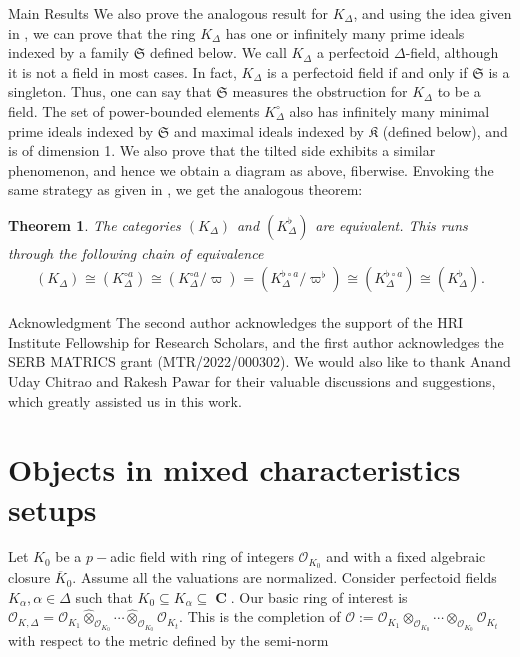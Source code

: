 \documentclass[12pts,a4paper]{amsart}
\newtheorem{theorem}[proposition]{Theorem}
\DeclareMathOperator{\fet}{f\acute{e}t}
\DeclareMathOperator{\C}{\textbf{C}}
\begin{document}
\begin{subsection}{Main Results}
We also prove the analogous result for $K_\Delta$, and using the idea given in \cite{Jac}, we can prove that the ring $K_\Delta$ has one or infinitely many prime ideals indexed by a family $\mathfrak{S}$ defined below. We call $K_\Delta$ a perfectoid $\Delta$-field, although it is not a field in most cases. In fact, $K_\Delta$ is a perfectoid field if and only if $\mathfrak{S}$ is a singleton. Thus, one can say that $\mathfrak{S}$ measures the obstruction for $K_\Delta$ to be a field. The set of power-bounded elements $K^\circ_\Delta$ also has infinitely many minimal prime ideals indexed by $\mathfrak{S}$ and maximal ideals indexed by $\mathfrak{K}$ (defined below), and is of dimension 1. We also prove that the tilted side exhibits a similar phenomenon, and hence we obtain a diagram as above, fiberwise. Envoking the same strategy as given in \cite{Sch}, we get the analogous theorem:

\begin{theorem}
    The categories $(K_\Delta)_{\fet}$ and $(K^{\flat}_{\Delta})_{\fet}$ are equivalent. This runs through the following chain of equivalence
    \begin{align*}
        (K_\Delta)_{\fet}\cong (K^{\circ a}_\Delta)_{\fet}\cong (K^{\circ a}_\Delta/\varpi)_{\fet}= (K^{\flat\circ a}_\Delta/{\varpi^\flat})_{\fet}\cong (K^{\flat\circ a}_\Delta)_{\fet}\cong (K^\flat_\Delta)_{\fet}.
    \end{align*}
\end{theorem}


\end{subsection}


\begin{subsection}{Acknowledgment}
The second author acknowledges the support of the HRI Institute Fellowship for Research Scholars, and the first author acknowledges the SERB MATRICS grant (MTR/2022/000302). We would also like to thank Anand Uday Chitrao and Rakesh Pawar for their valuable discussions and suggestions, which greatly assisted us in this work.
\end{subsection}



\section{Objects in mixed characteristics setups}\label{section1}

Let $K_0$ be a $p-$adic field with ring of integers $\mathcal{O}_{K_0}$ and with a fixed algebraic closure $\overline{K}_0$. Assume all the valuations are normalized. Consider perfectoid fields $K_\alpha, \alpha\in\Delta$ such that $K_0\subseteq K_\alpha\subseteq \C$. Our basic ring of interest is $\mathcal{O}_{K,\Delta}=\mathcal{O}_{K_1}\hat{\otimes}_{\mathcal{O}_{K_0}}\cdots\hat{\otimes}_{\mathcal{O}_{K_0}}\mathcal{O}_{K_t}$. This is the completion of $\mathcal{O}:=\mathcal{O}_{K_1}\otimes_{\mathcal{O}_{K_0}}\cdots\otimes_{\mathcal{O}_{K_0}}\mathcal{O}_{K_t}$ with respect to the metric defined by the semi-norm
\end{document}
